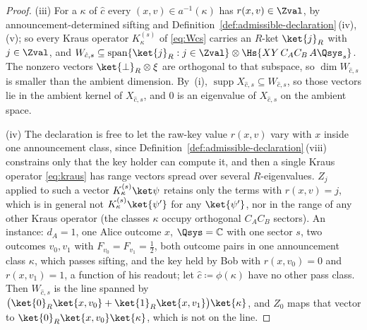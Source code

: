 \begin{proof}
(iii) For a  $\kappa$ of $\hat c$ every
$(x,v)\in a^{-1}(\kappa)$ has $r(x,v)\in\Zval$, by announcement-determined
sifting and Definition~\ref{def:admissible-declaration}\,(iv), (v); so every Kraus operator
$K^{(s)}_{\kappa}$ of \eqref{eq:Wcs} carries an $R$-ket $\ket{j}_R$ with
$j\in\Zval$, and $W_{\hat c,s}\subseteq\operatorname{span}\{\ket{j}_R:
j\in\Zval\}\otimes\Hs{XY\,C_AC_B\,A\Qsys_s}$. The nonzero vectors
$\ket{\perp}_R\otimes\xi$ are orthogonal to that subspace, so
$\dim W_{\hat c,s}$ is smaller than the ambient dimension. By~(i),
$\operatorname{supp}X_{\hat c,s}\subseteq W_{\hat c,s}$, so those vectors
lie in the ambient kernel of $X_{\hat c,s}$, and $0$ is an eigenvalue of
$X_{\hat c,s}$ on the ambient space.

(iv) The declaration is free to let the raw-key value $r(x,v)$ vary with
$x$ inside one announcement class, since
Definition~\ref{def:admissible-declaration}\,(viii) constrains only that the key holder can
compute it, and then a single Kraus operator \eqref{eq:kraus} has range
vectors spread over several $R$-eigenvalues. $Z_j$ applied to such a
vector $K^{(s)}_{\kappa}\ket\psi$ retains only the terms with
$r(x,v)=j$, which is in general not $K^{(s)}_{\kappa}\ket{\psi'}$ for any
$\ket{\psi'}$, nor in the range of any other Kraus operator (the classes
$\kappa$ occupy orthogonal $C_AC_B$ sectors). An instance: $d_A=1$, one
Alice outcome $x$, $\Qsys=\mathbb{C}$ with one sector $s$, two outcomes
$v_0,v_1$ with $F_{v_0}=F_{v_1}=\frac12$, both outcome pairs in one
announcement class $\kappa$, which passes sifting, and the key held by
Bob with $r(x,v_0)=0$ and $r(x,v_1)=1$, a function of his readout; let
$\hat c\coloneqq\phi(\kappa)$ have no other pass class. Then
$W_{\hat c,s}$ is the line spanned by
$\big(\ket{0}_R\ket{x,v_0}+\ket{1}_R\ket{x,v_1}\big)\ket{\kappa}$, and
$Z_0$ maps that vector to $\ket{0}_R\ket{x,v_0}\ket{\kappa}$, which is not
on the line.
\end{proof}
